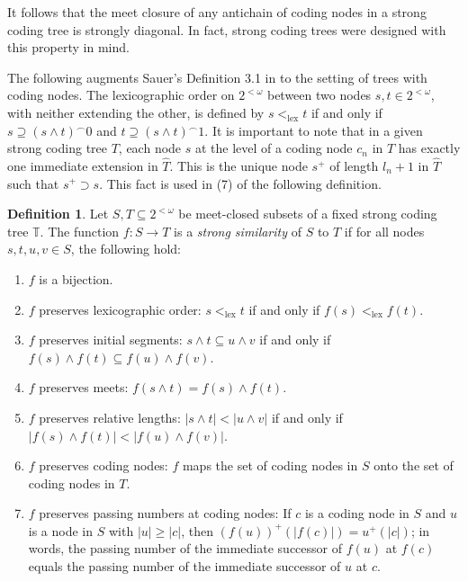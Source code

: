 \documentclass{amsart}
\theoremstyle{remark}
\theoremstyle{definition}
\newtheorem{defn}[thm]{Definition}
\theoremstyle{remark}
\newcommand{\om}{\omega}
\newcommand{\sse}{\subseteq}
\newcommand{\contains}{\supseteq}
\newcommand{\bT}{\mathbb{T}}
\newcommand{\ra}{\rightarrow}
\begin{document}
It follows that the meet closure of any antichain of coding nodes in a strong coding tree is  strongly diagonal.
In fact, strong coding trees were designed with this property in mind.




The following augments Sauer's Definition 3.1 in \cite{Sauer06}  to the setting of  trees with coding  nodes.
The lexicographic order on $2^{<\om}$
between two nodes
$s,t\in 2^{<\om}$, with neither extending the other,
is defined by
$s<_{\mathrm{lex}} t$ if and only if $s\contains (s\wedge t)^{\frown}0$ and $t\contains (s\wedge t)^{\frown}1$.
It is important to note that in a given strong coding tree $T$, each node $s$ at the level of a coding node $c_n$ in $T$
has exactly one  immediate extension in $\widehat{T}$.
This is the unique node $s^+$ of length $l_n+1$ in $\widehat{T}$ such that $s^+\supset s$.
This fact is used in (7) of the following definition.



\begin{defn}\label{def.3.1.likeSauer}
Let $S,T\sse 2^{<\om}$ be meet-closed subsets of  a fixed strong coding tree $\bT$.
The function $f:S\ra T$ is a {\em strong similarity} of $S$ to $T$ if for all nodes $s,t,u,v\in S$, the following hold:
\begin{enumerate}
\item
$f$ is a bijection.
\item
$f$ preserves lexicographic order: $s<_{\mathrm{lex}}t$ if and only if $f(s)<_{\mathrm{lex}}f(t)$.
\item
$f$ preserves initial segments:
$s\wedge t\sse u\wedge v$ if and only if $f(s)\wedge f(t)\sse f(u)\wedge f(v)$.


\item
$f$ preserves meets:
$f(s\wedge t)=f(s)\wedge f(t)$.

\item
$f$ preserves relative lengths:
$|s\wedge t|<|u\wedge v|$ if and only if
$|f(s)\wedge f(t)|<|f(u)\wedge f(v)|$.

\item $f$ preserves coding  nodes:
$f$ maps the set of  coding nodes in $S$
onto the set of coding nodes in $T$.
\item

$f$ preserves passing numbers at coding nodes:
If $c$ is a coding node in $S$ and $u$ is a node in $S$ with $|u|\ge|c|$,
then $(f(u))^+(|f(c)|)=u^+(|c|)$;
in words, the passing number of the immediate successor of $f(u)$ at $f(c)$  equals the passing number of the immediate successor of $u$ at $c$.
\end{enumerate}
\end{defn}
\end{document}

